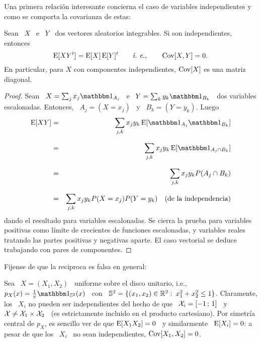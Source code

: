 Una primera relaci\'on interesante concierna el caso de variables independientes
y como se comporta la covarianza de estas:
%
\begin{lema}
\label{Lem:MP:IndependenciaCov}
%
  Sean  \  $X$  \ e  \  $Y$  \  dos  vectores  aleatorios integrables.   Si  son
  independientes, entonces
  \[
  \operatorname{E}[X Y^t] = \operatorname{E}[X] \operatorname{E}[Y]^t \qquad \mbox{{\it i.~e.,}} \qquad \operatorname{Cov}[X,Y] = 0.
  \]
  En  particular, para  $X$  con componentes  independientes,  $\operatorname{Cov}[X]$ es  una
  matriz diagonal.
\end{lema}
%
\begin{proof}
  Sean \ $X = \sum_j x_j \un_{A_j}$  \ e \ $Y = \sum_k y_k \un_{B_k}$ \
  dos variables escalonadas. Entonces, \ $A_j =  (X = x_j)$ \ y \ $B_k = (Y
  = y_k)$. Luego
  \begin{eqnarray*}
  \Esp[X Y] & = & \sum_{j,k} x_j y_k \Esp[\un_{A_j} \un_{B_k}]\\[2.5mm]
  & = & \sum_{j,k} x_j y_k \Esp[\un_{A_j \cap B_k}]\\[2.5mm]
  & = & \sum_{j,k} x_j y_k P(A_j \cap B_k)\\[2.5mm]
  & = & \sum_{j,k} x_j y_k P(X = x_j) P(Y = y_k) \quad \mbox{(de la independencia)}
  \end{eqnarray*}
  dando  el resultado  para  variables  escalonadas. Se  cierra  la prueba  para
  variables positivas  como l\'imite de  crecientes de funciones  escalonadas, y
  variables  reales tratando  las partes  positivas y  negativas aparte.  El caso
  vectorial se deduce trabajando con pares de componentes.
\end{proof}
%
Fijense  de que  la  reciproca es  falsa en  general:
%
\begin{ejemplo}
\label{Ej:MP:UniformeDiscoUnitario}
%
  Sea \  $X =  (X_1,X_2)$ \ uniforme  sobre el  disco unitario, i.e.,  $p_X(x) =
  \frac{1}{\pi} \un_{\Sset^2}(x)$ \  con \ $\mathbb{S}^2 = \{  (x_1,x_2) \in \mathbb{R}^2:
  \:  x_1^2  +  x_2^2  \le  1  \}$.  Claramente,  los  \  $X_i$  no  pueden  ser
  independientes del hecho de que  \ $\mathcal{X}_i = [-1 \, ; \, 1]$ \  y \ $\mathcal{X} \ne \mathcal{X}_1
  \times \mathcal{X}_2$  \ (es  estrictamente incluido en  el producto  cartesiano).  Por
  simetr\'ia central de  $p_X$, es sencillo ver  de que $\operatorname{E}[X_1 X_2] =  0$ \ y
  similarmente  \ $\operatorname{E}[X_i]  =  0$:  a pesar  de  que los  \  $X_i$  \ no  sean
  independientes, $\operatorname{Cov}[X_1,X_2] = 0$.
\end{ejemplo}

